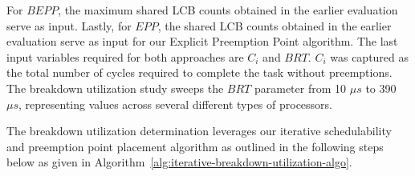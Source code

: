 For ${BEPP}$, the maximum shared LCB counts obtained in the earlier evaluation serve as input. Lastly, for ${EPP}$, the shared LCB counts obtained in the earlier evaluation serve as input for our Explicit Preemption Point algorithm.  The last input variables required for both approaches are ${C_i}$ and ${BRT}$. ${C_i}$ was captured as the total number of cycles required to complete the task without preemptions. The breakdown utilization study sweeps the ${BRT}$ parameter from 10 ${{\mu}s}$ to 390 ${{\mu}s}$, representing values across several different types of processors.

The breakdown utilization determination leverages our iterative schedulability and preemption point placement algorithm as outlined in the following steps below as given in Algorithm~\ref{alg:iterative-breakdown-utilization-algo}.
